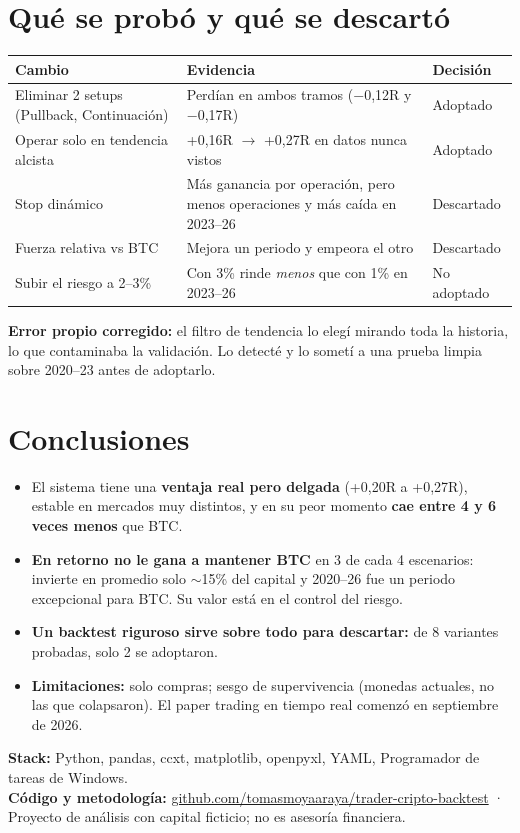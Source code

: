 \documentclass[10pt,a4paper]{article}
\begin{document}
\section{Qué se probó y qué se descartó}
\small
\begin{tabularx}{\linewidth}{@{}lXl@{}}
\toprule
\textbf{Cambio} & \textbf{Evidencia} & \textbf{Decisión} \\
\midrule
Eliminar 2 setups (Pullback, Continuación) & Perdían en ambos tramos ($-$0,12R y $-$0,17R) & Adoptado \\
Operar solo en tendencia alcista & +0,16R $\rightarrow$ +0,27R en datos nunca vistos & Adoptado \\
Stop dinámico & Más ganancia por operación, pero menos operaciones y más caída en 2023--26 & Descartado \\
Fuerza relativa vs BTC & Mejora un periodo y empeora el otro & Descartado \\
Subir el riesgo a 2--3\% & Con 3\% rinde \emph{menos} que con 1\% en 2023--26 & No adoptado \\
\bottomrule
\end{tabularx}
\normalsize

\textbf{Error propio corregido:} el filtro de tendencia lo elegí mirando toda la historia, lo que contaminaba la
validación. Lo detecté y lo sometí a una prueba limpia sobre 2020--23 antes de adoptarlo.

\section{Conclusiones}
\begin{itemize}
  \item El sistema tiene una \textbf{ventaja real pero delgada} (+0,20R a +0,27R), estable en mercados muy distintos,
        y en su peor momento \textbf{cae entre 4 y 6 veces menos} que BTC.
  \item \textbf{En retorno no le gana a mantener BTC} en 3 de cada 4 escenarios: invierte en promedio solo $\sim$15\% del
        capital y 2020--26 fue un periodo excepcional para BTC. Su valor está en el control del riesgo.
  \item \textbf{Un backtest riguroso sirve sobre todo para descartar:} de 8 variantes probadas, solo 2 se adoptaron.
  \item \textbf{Limitaciones:} solo compras; sesgo de supervivencia (monedas actuales, no las que colapsaron). El paper
        trading en tiempo real comenzó en septiembre de 2026.
\end{itemize}

\vfill
{\footnotesize\color{gris}\textbf{Stack:} Python, pandas, ccxt, matplotlib, openpyxl, YAML, Programador de tareas de Windows.\\
\textbf{Código y metodología:} \href{https://github.com/tomasmoyaaraya/trader-cripto-backtest}{github.com/tomasmoyaaraya/trader-cripto-backtest}
· Proyecto de análisis con capital ficticio; no es asesoría financiera.}
\end{document}
